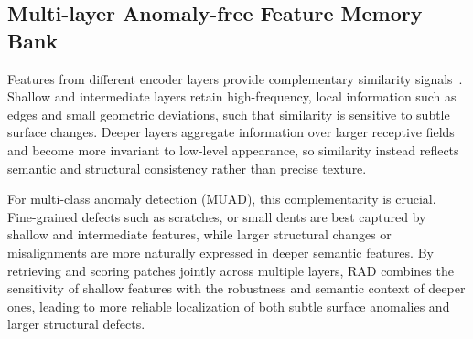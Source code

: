 \documentclass{article}
\theoremstyle{plain}
\theoremstyle{definition}
\theoremstyle{remark}
\begin{document}


\subsection{Multi-layer Anomaly-free Feature Memory Bank}
\label{sec:memory}
Features from different encoder layers provide complementary similarity signals~\cite{park2023self,amir2022effectiveness}. Shallow and intermediate layers retain high-frequency, local information such as edges and small geometric deviations, such that similarity is sensitive to subtle surface changes. Deeper layers aggregate information over larger receptive fields and become more invariant to low-level appearance, so similarity instead reflects semantic and structural consistency rather than precise texture.

For multi-class anomaly detection (MUAD), this complementarity is crucial. Fine-grained defects such as scratches, or small dents are best captured by shallow and intermediate features, while larger structural changes or misalignments are more naturally expressed in deeper semantic features. By retrieving and scoring patches jointly across multiple layers, RAD combines the sensitivity of shallow features with the robustness and semantic context of deeper ones, leading to more reliable localization of both subtle surface anomalies and larger structural defects.
\end{document}
